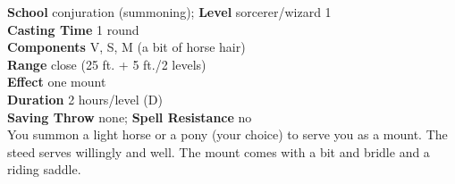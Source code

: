 \textbf{School} conjuration (summoning); \textbf{Level} sorcerer/wizard 1\\
\textbf{Casting Time} 1 round\\
\textbf{Components} V, S, M (a bit of horse hair)\\
\textbf{Range} close (25 ft. + 5 ft./2 levels)\\
\textbf{Effect} one mount\\
\textbf{Duration} 2 hours/level (D)\\
\textbf{Saving Throw} none; \textbf{Spell Resistance} no\\
You summon a light horse or a pony (your choice) to serve you as a mount. The steed serves willingly and well. The mount comes with a bit and bridle and a riding saddle.\\
